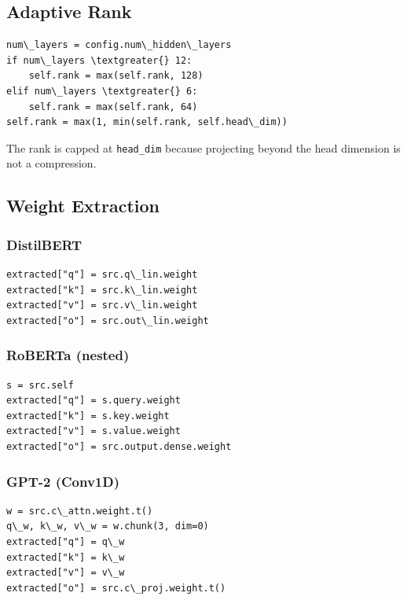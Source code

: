 \subsection{Adaptive Rank}

\begin{lstlisting}
num\_layers = config.num\_hidden\_layers
if num\_layers \textgreater{} 12:
    self.rank = max(self.rank, 128)
elif num\_layers \textgreater{} 6:
    self.rank = max(self.rank, 64)
self.rank = max(1, min(self.rank, self.head\_dim))
\end{lstlisting}

The rank is capped at \texttt{head\_dim} because projecting beyond the head 
dimension is not a compression.

\subsection{Weight Extraction}

\subsubsection{DistilBERT}

\begin{lstlisting}
extracted["q"] = src.q\_lin.weight
extracted["k"] = src.k\_lin.weight
extracted["v"] = src.v\_lin.weight
extracted["o"] = src.out\_lin.weight
\end{lstlisting}

\subsubsection{RoBERTa (nested)}

\begin{lstlisting}
s = src.self
extracted["q"] = s.query.weight
extracted["k"] = s.key.weight
extracted["v"] = s.value.weight
extracted["o"] = src.output.dense.weight
\end{lstlisting}

\subsubsection{GPT-2 (Conv1D)}

\begin{lstlisting}
w = src.c\_attn.weight.t()
q\_w, k\_w, v\_w = w.chunk(3, dim=0)
extracted["q"] = q\_w
extracted["k"] = k\_w
extracted["v"] = v\_w
extracted["o"] = src.c\_proj.weight.t()
\end{lstlisting}

